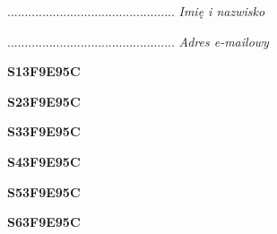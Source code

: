 \begin{turn}{90}\begin{minipage}{\linewidth} \vspace{20mm} ................................................  \textit{Imię i nazwisko}\end{minipage}\end{turn}

\begin{turn}{90}\begin{minipage}{\linewidth} \vspace{20mm} ................................................  \textit{Adres e-mailowy}\end{minipage}\end{turn}

\begin{turn}{90}\huge \begin{minipage}{\linewidth} \vspace{10mm}\textbf{S13F9E95C}\end{minipage}\end{turn}

\begin{turn}{90}\huge \begin{minipage}{\linewidth} \vspace{10mm}\textbf{S23F9E95C}\end{minipage}\end{turn}

\begin{turn}{90}\huge \begin{minipage}{\linewidth} \vspace{10mm}\textbf{S33F9E95C}\end{minipage}\end{turn}

\begin{turn}{90}\huge \begin{minipage}{\linewidth} \vspace{10mm}\textbf{S43F9E95C}\end{minipage}\end{turn}

\begin{turn}{90}\huge \begin{minipage}{\linewidth} \vspace{10mm}\textbf{S53F9E95C}\end{minipage}\end{turn}

\begin{turn}{90}\huge \begin{minipage}{\linewidth} \vspace{10mm}\textbf{S63F9E95C}\end{minipage}\end{turn}

